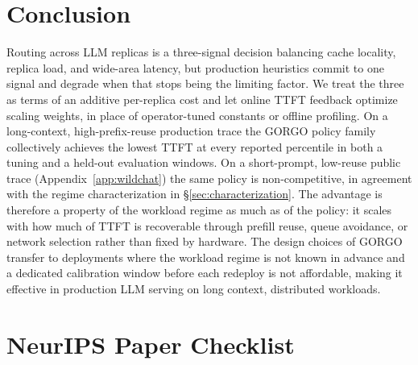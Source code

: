 \documentclass{article}
\begin{document}
\section{Conclusion}
\label{sec:conclusion}

Routing across LLM replicas is a three-signal decision balancing cache locality, replica
load, and wide-area latency, but production heuristics commit to one signal and
degrade when that stops being the limiting factor. We treat the three as
terms of an additive per-replica cost and let online TTFT feedback optimize 
scaling weights, in place of operator-tuned constants or offline profiling. On a
long-context, high-prefix-reuse production trace the GORGO policy family
collectively achieves the lowest TTFT at every reported percentile in both a
tuning and a held-out evaluation windows. On a short-prompt, low-reuse public
trace (Appendix~\ref{app:wildchat}) the same policy is non-competitive, in
agreement with the regime characterization in
\S\ref{sec:characterization}. The advantage is therefore a property of the
workload regime as much as of the policy: it scales with how much of TTFT is
recoverable through prefill reuse, queue avoidance, or network selection rather
than fixed by hardware. The design choices of GORGO transfer to
deployments where the workload regime is not known in advance and a dedicated
calibration window before each redeploy is not affordable, making it effective in production LLM serving on long context, distributed workloads. 




\newpage

\section*{NeurIPS Paper Checklist}
\end{document}
